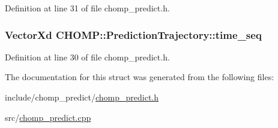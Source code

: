 Definition at line 31 of file chomp\+\_\+predict.\+h.

\subsubsection[{\texorpdfstring{time\+\_\+seq}{time_seq}}]{\setlength{\rightskip}{0pt plus 5cm}Vector\+Xd C\+H\+O\+M\+P\+::\+Prediction\+Trajectory\+::time\+\_\+seq}\hypertarget{struct_c_h_o_m_p_1_1_prediction_trajectory_ae8b2997764b253ed927a7f24cea9a9fe}{}\label{struct_c_h_o_m_p_1_1_prediction_trajectory_ae8b2997764b253ed927a7f24cea9a9fe}


Definition at line 30 of file chomp\+\_\+predict.\+h.



The documentation for this struct was generated from the following files\+:\begin{DoxyCompactItemize}
\item 
include/chomp\+\_\+predict/\hyperlink{chomp__predict_8h}{chomp\+\_\+predict.\+h}\item 
src/\hyperlink{chomp__predict_8cpp}{chomp\+\_\+predict.\+cpp}\end{DoxyCompactItemize}
